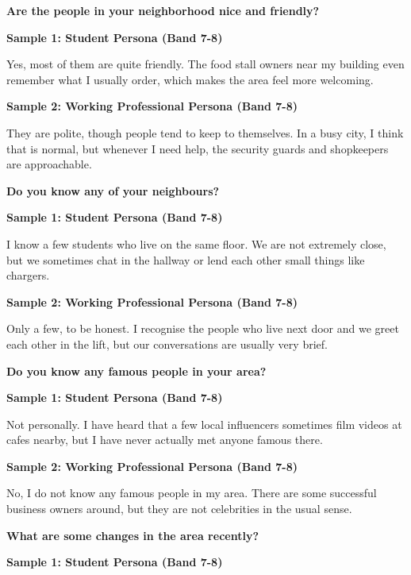 \separator

\begin{ieltsquestion}
\textbf{Are the people in your neighborhood nice and friendly?}
\end{ieltsquestion}
\textbf{Sample 1: Student Persona (Band 7-8)}

Yes, most of them are quite friendly. The food stall owners near my building even remember what I usually order, which makes the area feel more welcoming.

\textbf{Sample 2: Working Professional Persona (Band 7-8)}

They are polite, though people tend to keep to themselves. In a busy city, I think that is normal, but whenever I need help, the security guards and shopkeepers are approachable.

\separator

\begin{ieltsquestion}
\textbf{Do you know any of your neighbours?}
\end{ieltsquestion}
\textbf{Sample 1: Student Persona (Band 7-8)}

I know a few students who live on the same floor. We are not extremely close, but we sometimes chat in the hallway or lend each other small things like chargers.

\textbf{Sample 2: Working Professional Persona (Band 7-8)}

Only a few, to be honest. I recognise the people who live next door and we greet each other in the lift, but our conversations are usually very brief.

\separator

\begin{ieltsquestion}
\textbf{Do you know any famous people in your area?}
\end{ieltsquestion}
\textbf{Sample 1: Student Persona (Band 7-8)}

Not personally. I have heard that a few local influencers sometimes film videos at cafes nearby, but I have never actually met anyone famous there.

\textbf{Sample 2: Working Professional Persona (Band 7-8)}

No, I do not know any famous people in my area. There are some successful business owners around, but they are not celebrities in the usual sense.

\separator

\begin{ieltsquestion}
\textbf{What are some changes in the area recently?}
\end{ieltsquestion}
\textbf{Sample 1: Student Persona (Band 7-8)}

